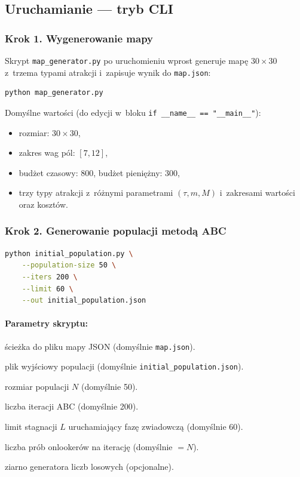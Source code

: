 \subsection{Uruchamianie --- tryb CLI}

\subsubsection{Krok 1. Wygenerowanie mapy}

Skrypt \texttt{map\_generator.py} po uruchomieniu wprost generuje mapę
$30 \times 30$ z~trzema typami atrakcji i~zapisuje wynik do \texttt{map.json}:

\begin{lstlisting}[language=bash]
python map_generator.py
\end{lstlisting}

Domyślne wartości (do edycji w~bloku \texttt{if \_\_name\_\_ == "\_\_main\_\_"}):
\begin{itemize}
    \item rozmiar: $30 \times 30$,
    \item zakres wag pól: $[7, 12]$,
    \item budżet czasowy: $800$, budżet pieniężny: $300$,
    \item trzy typy atrakcji z~różnymi parametrami $(\tau, m, M)$
          i~zakresami wartości oraz kosztów.
\end{itemize}

\subsubsection{Krok 2. Generowanie populacji metodą ABC}

\begin{lstlisting}[language=bash]
python initial_population.py \
    --population-size 50 \
    --iters 200 \
    --limit 60 \
    --out initial_population.json
\end{lstlisting}

\paragraph{Parametry skryptu:}
\begin{description}[leftmargin=2.6cm,style=nextline]
    \item[\texttt{-{}-map}] ścieżka do pliku mapy JSON (domyślnie \texttt{map.json}).
    \item[\texttt{-{}-out}] plik wyjściowy populacji (domyślnie \texttt{initial\_population.json}).
    \item[\texttt{-{}-population-size}] rozmiar populacji $N$ (domyślnie 50).
    \item[\texttt{-{}-iters}] liczba iteracji ABC (domyślnie 200).
    \item[\texttt{-{}-limit}] limit stagnacji $L$ uruchamiający fazę zwiadowczą (domyślnie 60).
    \item[\texttt{-{}-onlookers}] liczba prób onlookerów na iterację (domyślnie $= N$).
    \item[\texttt{-{}-seed}] ziarno generatora liczb losowych (opcjonalne).
\end{description}

